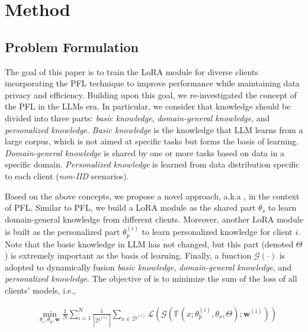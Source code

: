 \documentclass[sigconf]{acmart}
\newcommand\our{\text{FDLoRA}}
\begin{document}
\section{Method} \label{sec:overview}
\subsection{Problem Formulation}
The goal of this paper is to train the LoRA module for diverse clients incorporating the PFL technique to improve performance while maintaining data privacy and efficiency. Building upon this goal, we re-investigated the concept of the PFL in the LLMs era. In particular, we consider that knowledge should be divided into three parts: \textit{basic knowledge}, \textit{domain-general knowledge}, and \textit{personalized knowledge}. \textit{Basic knowledge} is the knowledge that LLM learns from a large corpus, which is not aimed at specific tasks but forms the basis of learning. \textit{Domain-general knowledge} is shared by one or more tasks based on data in a specific domain. \textit{Personalized knowledge }is learned from data distribution specific to each client (\textit{non-IID} scenarios). 
\par
Based on the above concepts, we propose a novel approach, a.k.a \our{}, in the context of PFL. Similar to PFL, we build a LoRA module as the shared part $\theta_{s}$ to learn domain-general knowledge from different clients. Moreover, another LoRA module is built as the personalized part $\theta_{p}^{(i)}$ to learn personalized knowledge for client $i$. Note that the basic knowledge in LLM has not changed, but this part (denoted $\Theta$) is extremely important as the basis of learning. Finally, a function $\mathcal{G}(\cdot)$ is adopted to dynamically fusion \textit{basic knowledge}, \textit{domain-general knowledge}, and \textit{personalized knowledge}. The objective of \our{} is to minimize the sum of the loss of all clients' models, i.e.,

\begin{equation}
    \begin{array}{cc}
         &  \min \limits_{\theta_{s}, \theta_{p}, \mathbf{w}} \frac{1}{N} \sum \limits_{i=1}^{N} \frac{1}{|\mathcal{D}^{(i)}|} \sum \limits_{x \in \mathcal{D}^{(i)}} \mathcal{L} \left(\mathcal{G} (\mathbb{F} (x; \theta_{p}^{(i)}, \theta_{s}, \Theta); \mathbf{w}^{(i)}) \right) \\
    \end{array}
\end{equation}
\end{document}
